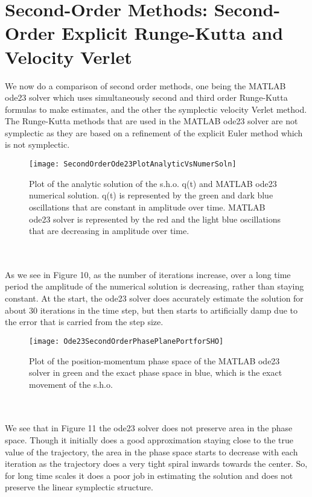 \documentclass[12pt]{article}
\begin{document}
\section{Second-Order Methods: Second-Order Explicit Runge-Kutta and Velocity Verlet}
We now do a comparison of second order methods, one being the MATLAB ode23 solver which uses simultaneously second and third order Runge-Kutta formulas to make estimates, and the other the symplectic velocity Verlet method. The Runge-Kutta methods that are used in the MATLAB ode23 solver are not symplectic as they are based on a refinement of the explicit Euler method which is not symplectic.
\begin{figure}[h!]
\centering
\texttt{[image: SecondOrderOde23PlotAnalyticVsNumerSoln]}
\caption{Plot of the analytic solution of the s.h.o. q(t) and MATLAB ode23 numerical solution. q(t) is represented by the green and dark blue oscillations that are constant in amplitude over time. MATLAB ode23 solver is represented by the red and the light blue oscillations that are decreasing in amplitude over time.}
\end{figure}
\\\\\indent As we see in Figure 10, as the number of iterations increase, over a long time period the amplitude of the numerical solution is decreasing, rather than staying constant. At the start, the ode23 solver does accurately estimate the solution for about 30 iterations in the time step, but then starts to artificially damp due to the error that is carried from the step size.\\
\begin{figure}[h!]
\centering
\texttt{[image: Ode23SecondOrderPhasePlanePortforSHO]}
\caption{Plot of the position-momentum phase space of the MATLAB ode23 solver in green and the exact phase space in blue, which is the exact movement of the s.h.o.}
\end{figure}
\\\\\indent We see that in Figure 11 the ode23 solver does not preserve area in the phase space. Though it initially does a good approximation staying close to the true value of the trajectory, the area in the phase space starts to decrease with each iteration as the trajectory does a very tight spiral inwards towards the center. So, for long time scales it does a poor job in estimating the solution and does not preserve the linear symplectic structure.\\
\end{document}

